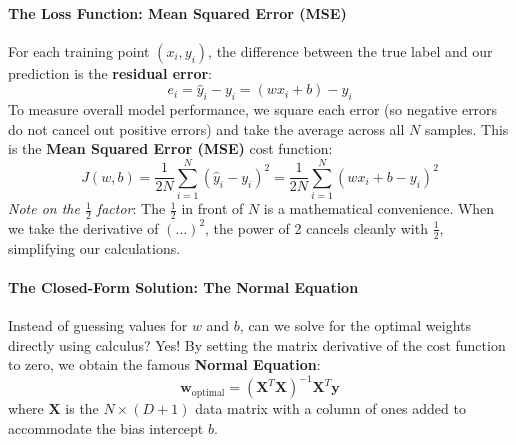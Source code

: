 \paragraph{The Loss Function: Mean Squared Error (MSE)}
For each training point $(x_i, y_i)$, the difference between the true label and our prediction is the \textbf{residual error}:
\begin{equation*}
e_i = \hat{y}_i - y_i = (w x_i + b) - y_i
\end{equation*}
To measure overall model performance, we square each error (so negative errors do not cancel out positive errors) and take the average across all $N$ samples. This is the \textbf{Mean Squared Error (MSE)} cost function:
\begin{equation}
J(w, b) = \frac{1}{2N} \sum_{i=1}^N (\hat{y}_i - y_i)^2 = \frac{1}{2N} \sum_{i=1}^N (w x_i + b - y_i)^2\label{eq:mse_cost}
\end{equation}
\textit{Note on the $\frac{1}{2}$ factor}: The $\frac{1}{2}$ in front of $N$ is a mathematical convenience. When we take the derivative of $(\dots)^2$, the power of 2 cancels cleanly with $\frac{1}{2}$, simplifying our calculations.

\paragraph{The Closed-Form Solution: The Normal Equation}
Instead of guessing values for $w$ and $b$, can we solve for the optimal weights directly using calculus? Yes! By setting the matrix derivative of the cost function to zero, we obtain the famous \textbf{Normal Equation}:
\begin{equation}
\mathbf{w}_{\text{optimal}} = (\mathbf{X}^T \mathbf{X})^{-1} \mathbf{X}^T \mathbf{y}\label{eq:normal_equation}
\end{equation}
where $\mathbf{X}$ is the $N \times (D+1)$ data matrix with a column of ones added to accommodate the bias intercept $b$.

